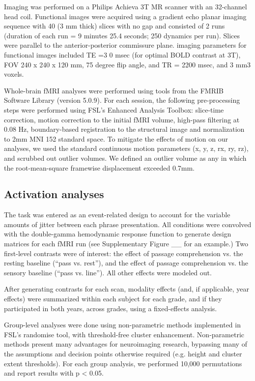 Imaging was performed on a Philips Achieva 3T MR scanner with an 32-channel head coil. Functional images were acquired using a gradient echo planar imaging sequence with 40 (3 mm thick) slices with no gap and consisted of 2 runs (duration of each run = 9 minutes 25.4 seconds; 250 dynamics per run). Slices were parallel to the anterior-posterior commissure plane. imaging parameters for functional images included TE =3 0 msec (for optimal BOLD contrast at 3T), FOV 240 x 240 x 120 mm, 75 degree flip angle, and TR = 2200 msec, and 3 mm3 voxels.

Whole-brain fMRI analyses were performed using tools from the FMRIB Software Library (version 5.0.9). For each session, the following pre-processing steps were performed using FSL’s Enhanced Analysis Toolbox:  slice-time correction, motion correction to the initial fMRI volume, high-pass filtering at 0.08 Hz, boundary-based registration to the structural image and normalization to 2mm MNI 152 standard space. To mitigate the effects of motion on our analyses, we used the standard continuous motion parameters (x, y, z, rx, ry, rz), and scrubbed out outlier volumes. We defined an outlier volume as any in which the root-mean-square framewise displacement exceeded 0.7mm. 

\subsection{Activation analyses}

The task was entered as an event-related design to account for the variable amounts of jitter between each phrase presentation. All conditions were convolved with the double-gamma hemodynamic response function to generate design matrices for each fMRI run (see Supplementary Figure __ for an example.) Two first-level contrasts were of interest: the effect of passage comprehension vs. the resting baseline (“pass vs. rest”), and the effect of passage comprehension vs. the sensory baseline (“pass vs. line”). All other effects were modeled out.

After generating contrasts for each scan, modality effects (and, if applicable, year effects) were summarized within each subject for each grade, and if they participated in both years, across grades, using a fixed-effects analysis. 

Group-level analyses were done using non-parametric methods implemented in FSL’s randomise tool, with threshold-free cluster enhancement. Non-parametric methods present many advantages for neuroimaging research, bypassing many of the assumptions and decision points otherwise required (e.g. height and cluster extent thresholds). For each group analysis, we performed 10,000 permutations and report results with p < 0.05. 

